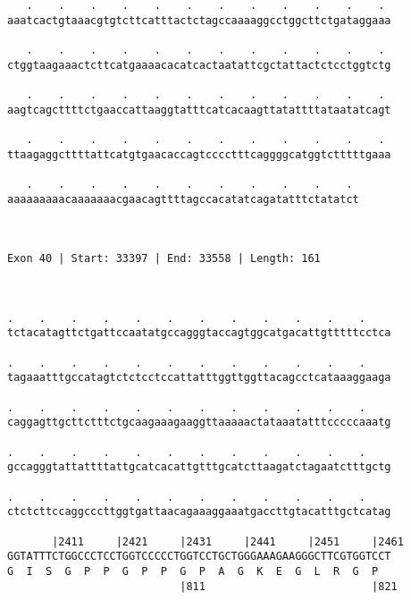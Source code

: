 \documentclass{article}
\begin{document}
\begin{Verbatim}
   .    .    .    .    .    .    .    .    .    .    .    . 
aaatcactgtaaacgtgtcttcatttactctagccaaaaggcctggcttctgataggaaa
                                                            
   .    .    .    .    .    .    .    .    .    .    .    . 
ctggtaagaaactcttcatgaaaacacatcactaatattcgctattactctcctggtctg
                                                            
   .    .    .    .    .    .    .    .    .    .    .    . 
aagtcagcttttctgaaccattaaggtatttcatcacaagttatattttataatatcagt
                                                            
   .    .    .    .    .    .    .    .    .    .    .    . 
ttaagaggcttttattcatgtgaacaccagtcccctttcaggggcatggtctttttgaaa
                                                            
   .    .    .    .    .    .    .    .    .    .    . 
aaaaaaaaacaaaaaaacgaacagttttagccacatatcagatatttctatatct
                                                       
                                                       
 
Exon 40 | Start: 33397 | End: 33558 | Length: 161



.    .    .    .    .    .    .    .    .    .    .    .    
tctacatagttctgattccaatatgccagggtaccagtggcatgacattgtttttcctca
                                                            
.    .    .    .    .    .    .    .    .    .    .    .    
tagaaatttgccatagtctctcctccattatttggttggttacagcctcataaaggaaga
                                                            
.    .    .    .    .    .    .    .    .    .    .    .    
caggagttgcttctttctgcaagaaagaaggttaaaaactataaatatttcccccaaatg
                                                            
.    .    .    .    .    .    .    .    .    .    .    .    
gccagggtattattttattgcatcacattgtttgcatcttaagatctagaatctttgctg
                                                            
.    .    .    .    .    .    .    .    .    .    .    .    
ctctcttccaggcccttggtgattaacagaaaggaaatgaccttgtacatttgctcatag
                                                            
       |2411     |2421     |2431     |2441     |2451     |2461
GGTATTTCTGGCCCTCCTGGTCCCCCTGGTCCTGCTGGGAAAGAAGGGCTTCGTGGTCCT
G  I  S  G  P  P  G  P  P  G  P  A  G  K  E  G  L  R  G  P  
                           |811                          |821
  

\end{Verbatim}
\end{document}
